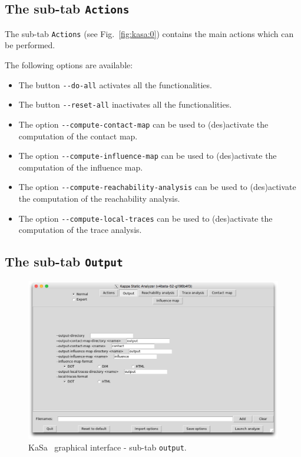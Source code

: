 \documentclass[11pt]{book}
\def\KaSa{\textsf{KaSa}}
\begin{document}
\subsection{The sub-tab \texttt{Actions}}

The sub-tab \texttt{Actions} (see Fig.~\ref{fig:kasa:0}) contains the main actions which can be performed.

The following options are available:
\begin{itemize}
\item The button \texttt{-{}-do-all} activates all the functionalities.
\item The button \texttt{-{}-reset-all} inactivates all the functionalities.
\item The option \texttt{-{}-compute-contact-map} can be used to (des)activate the computation of the contact map.
\item The option \texttt{-{}-compute-influence-map} can be used to (des)activate the computation of the influence map.
\item The option \texttt{-{}-compute-reachability-analysis} can be used to (des)activate the computation of the reachability analysis.
\item The option \texttt{-{}-compute-local-traces} can be used to (des)activate the computation of the trace analysis.
\end{itemize}

\subsection{The sub-tab \texttt{Output}}

\begin{figure}[htbp]
\centering
\includegraphics[width=12cm,bb=0 0 1904 1208]{img/kasa_1.png}
\caption{\KaSa~ graphical interface - sub-tab \texttt{output}.}
\label{fig:kasa:1}
\end{figure}
\end{document}
